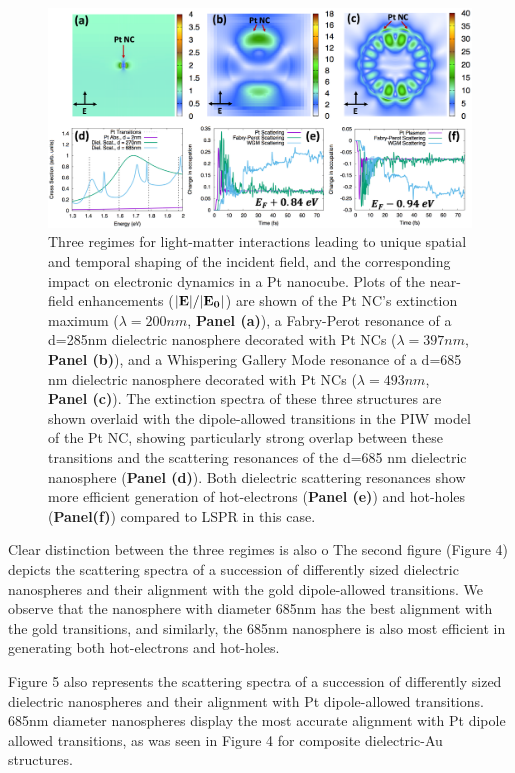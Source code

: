 \documentclass[journal=jpclcd,manuscript=letter]{achemso}
\begin{document}
\begin{figure}
\begin{center}
\includegraphics[width=6in]{figs/Pt_AllThree_Alternate.png}
\caption{Three regimes for light-matter interactions leading to unique
spatial and temporal shaping of the incident field, and the corresponding
impact on electronic dynamics in a Pt nanocube. Plots of the near-field enhancements (${\bf |E|}/{\bf |E_0|}$) are shown of the
Pt NC's extinction maximum ($\lambda=200 nm$, {\bf Panel (a)}), a Fabry-Perot resonance of a d=285nm dielectric nanosphere decorated with Pt NCs 
($\lambda = 397 nm$, {\bf Panel (b)}),
and a Whispering Gallery Mode resonance of a d=685 nm dielectric nanosphere decorated with Pt NCs ($\lambda = 493 nm$, {\bf Panel (c)}).
The extinction spectra of these three structures are shown overlaid with the dipole-allowed transitions in the PIW model of the Pt NC, showing particularly
strong overlap between these transitions and the scattering resonances of the d=685 nm dielectric nanosphere ({\bf Panel (d)}).
Both dielectric scattering resonances show more efficient generation of hot-electrons ({\bf Panel (e)}) and hot-holes ({\bf Panel(f)}) compared to LSPR in this case.}
\end{center}
\end{figure}


Clear distinction between the three regimes is also o
The second figure (Figure 4) depicts the scattering spectra of a succession of differently sized dielectric nanospheres
and their alignment with the gold dipole-allowed transitions. We observe that the nanosphere with diameter 685nm
has the best alignment with the gold transitions, and similarly, the 685nm nanosphere is also most efficient
in generating both hot-electrons and hot-holes. 

Figure 5 also represents the scattering spectra of a succession of differently sized dielectric nanospheres and their alignment with 
Pt dipole-allowed transitions. 685nm diameter nanospheres display the most accurate alignment with Pt dipole allowed 
transitions, as was seen in Figure 4 for composite dielectric-Au structures. 
\end{document}
